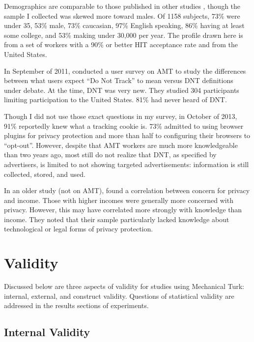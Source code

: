 Demographics are comparable to those published in other studies  \citep{Ross:2010jm,Ipeirotis:2010tt,Mason:2011cl}, though the sample I collected was skewed more toward males.  Of 1158 subjects, 73\% were under 35, 53\% male, 73\% caucasian, 97\% English speaking, 86\% having at least some college, and 53\% making under 30,000 per year. The profile drawn here is from a set of workers with a 90\% or better HIT acceptance rate and from the United States.

In September of 2011,  \cite{McDonald:2011uv}  conducted a user survey on AMT to study the differences between what users expect ``Do Not Track'' to mean versus DNT definitions under debate. At the time, DNT was very new. They studied 304 participants limiting participation to the United States. 81\% had never heard of DNT.

Though I did not use those exact questions in my survey, in October of 2013, 91\% reportedly knew what a tracking cookie is. 73\% admitted to using browser plugins for privacy protection and more than half to configuring their browsers to ``opt-out''. However, despite that AMT workers are much more knowledgeable than two years ago, most still do not realize that DNT, as specified by advertisers, is limited to not showing targeted advertisements: information is still collected, stored, and used.

In an older study (not on AMT),  \cite{Acquisti:2005hv}  found a correlation between concern for privacy and income. Those with higher incomes were generally more concerned with privacy. However, this may have correlated more strongly with knowledge than income. They noted that their sample particularly lacked knowledge about technological or legal forms of privacy protection.

\section{Validity}
\label{validity}

Discussed below are three aspects of validity for studies using Mechanical Turk: internal, external, and construct validity. Questions of statistical validity are addressed in the results sections of experiments.

\subsection{Internal Validity}
\label{internalvalidity}

